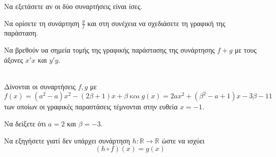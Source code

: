 \documentclass[twoside,nofonts,ektypwsh]{frontisthrio-diag}
\begin{document}
\begin{thema}
\begin{erwthma}
\item Να εξετάσετε αν οι δύο συναρτήσεις είναι ίσες.
\item Να ορίσετε τη συνάρτηση $ \frac{g}{f} $ και στη συνέχεια να σχεδιάσετε τη γραφική της παράσταση.
\item Να βρεθούν υα σημεία τομής της γραφικής παράστασης της συνάρτησης $ f+g $ με τους άξονες $ x'x $ και $ y'y $.
\end{erwthma}
\item\mbox{}\\
Δίνονται οι συναρτήσεις $ f,g $ με 
\[ f(x)=(a^2-a)x^2-(2\beta+1)x+\beta\ \textrm{και}\ g(x)=2ax^2+(\beta^2-a+1)x-3\beta-11 \]
των οποίων οι γραφικές παραστάσεις τέμνονται στην ευθεία $ x=-1 $.
\begin{erwthma}
\item Να δείξετε ότι $ a=2$ και $\beta=-3 $.
\item Να εξηγήσετε γιατί δεν υπάρχει συνάρτηση $ h:\mathbb{R}\to\mathbb{R} $ ώστε να ισχύει
\[ (h\circ f)(x)=g(x) \]
\end{erwthma}
\end{thema}
\kaliepityxia
\end{document}

